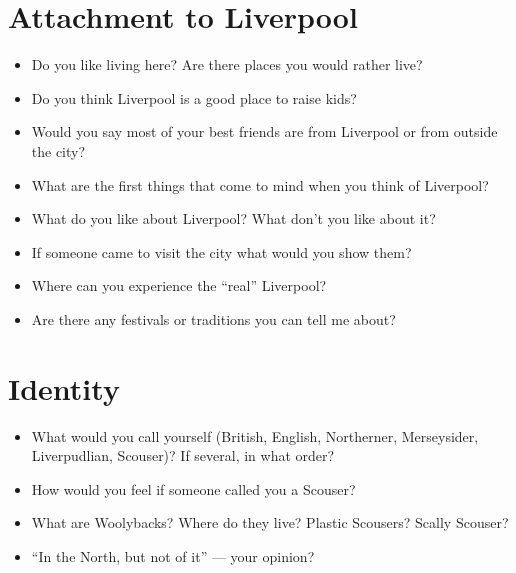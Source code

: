 	\section*{Attachment to Liverpool}
	\begin{multicols}{2}
		\begin{itemize}
			\item Do you like living here? Are there places you would rather live?
			\item Do you think Liverpool is a good place to raise kids?
			\item Would you say most of your best friends are from Liverpool or from outside the city?
			\item What are the first things that come to mind when you think of Liverpool?
			\item What do you like about Liverpool? What don't you like about it?
			\item If someone came to visit the city what would you show them?
			\item Where can you experience the \enquote{real} Liverpool?
			\item Are there any festivals or traditions you can tell me about?
		\end{itemize}
	\end{multicols}
	
	\section*{Identity}
	\begin{multicols}{2}
		\begin{itemize}
			\item What would you call yourself (British, English, Northerner, Merseysider, Liverpudlian, Scouser)? If several, in what order?
			\item How would you feel if someone called you a Scouser?
			\item What are Woolybacks? Where do they live? Plastic Scousers? Scally Scouser?
			\item ``In the North, but not of it'' --- your opinion?
		\end{itemize}
	\end{multicols}
	
